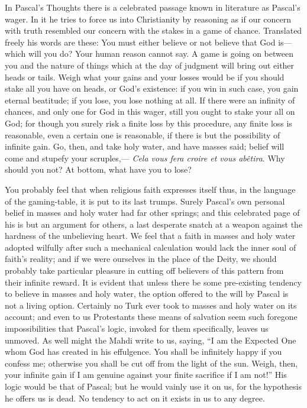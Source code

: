 \documentclass[12pt]{article}
\begin{document}
In Pascal's Thoughts there is a celebrated passage known in literature as Pascal's wager.  In it he tries to force us into Christianity by reasoning as if our concern with truth resembled our concern with the stakes in a game of chance.  Translated freely his words are these: You must either believe or not believe that God is--- which will you do? Your human reason cannot say.  A game is going on between you and the nature of things which at the day of judgment will bring out either heads or tails.  Weigh what your gains and your losses would be if you should stake all you have on heads, or God's existence: if you win in such case, you gain eternal beatitude; if you lose, you lose nothing at all.  If there were an infinity of chances, and only one for God in this wager, still you ought to stake your all on God; for though you surely risk a finite loss by this procedure, any finite loss is reasonable, even a certain one is reasonable, if there is but the possibility of  infinite gain.  Go, then, and take holy water, and have masses said; belief will come and stupefy your scruples,--- \emph{Cela vous fera croire et vous ab\^{e}tira}.  Why should you not?  At bottom, what have you to lose?

You probably feel that when religious faith expresses itself thus, in the language of the gaming-table, it is put to its last trumps.  Surely Pascal's own personal belief in masses and holy water had far other springs; and this celebrated page of his is but an argument for others, a last desperate snatch at a weapon against the hardness of the unbelieving heart.  We feel that a faith in masses and holy water adopted wilfully after such a mechanical calculation would lack the inner soul of faith's reality; and if we were ourselves in the place of the Deity, we should probably take particular pleasure in cutting off believers of this pattern from their infinite reward.  It is evident that unless there be some pre-existing tendency to believe in masses and holy water, the option offered to the will by Pascal is not a living option.  Certainly no Turk ever took to masses and holy water on its account; and even to us Protestants these means of salvation seem such foregone impossibilities that Pascal's logic, invoked for them specifically, leaves us unmoved.  As well might the Mahdi write to us, saying, ``I am the Expected One whom God has created in his effulgence. You shall be infinitely happy if you confess me; otherwise you shall be cut off from the light of the sun.  Weigh, then, your infinite gain if I am genuine against your finite sacrifice if I am not!''  His logic would be that of Pascal; but he would vainly use it on us, for the hypothesis he offers us is dead.  No tendency to act on it exists in us to any degree.
\end{document}
